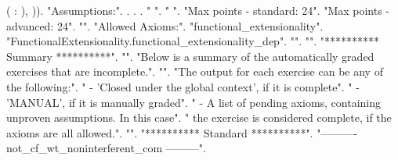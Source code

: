 \documentclass[12pt]{report}
\begin{document}
\begin{coqdoccode}
\coqdocindent{1.50em}
(\coqdocvar{\_} :    ),\coqdoceol
\coqdocindent{0.50em}
  )).\coqdoceol
\coqdocnoindent
{} "Assumptions:".\coqdoceol
\coqdocnoindent
{}.\coqdoceol
\coqdocnoindent
{}  .\coqdoceol
\coqdocnoindent
{} .\coqdoceol
\coqdocnoindent
{} " ".\coqdoceol
\coqdocemptyline
\coqdocnoindent
{} " ".\coqdoceol
\coqdocemptyline
\coqdocnoindent
{} "Max points - standard: 24".\coqdoceol
\coqdocnoindent
{} "Max points - advanced: 24".\coqdoceol
\coqdocnoindent
{} "".\coqdoceol
\coqdocnoindent
{} "Allowed Axioms:".\coqdoceol
\coqdocnoindent
{} "functional\_extensionality".\coqdoceol
\coqdocnoindent
{} "FunctionalExtensionality.functional\_extensionality\_dep".\coqdoceol
\coqdocnoindent
{} "".\coqdoceol
\coqdocnoindent
{} "".\coqdoceol
\coqdocnoindent
{} "********** Summary **********".\coqdoceol
\coqdocnoindent
{} "".\coqdoceol
\coqdocnoindent
{} "Below is a summary of the automatically graded exercises that are incomplete.".\coqdoceol
\coqdocnoindent
{} "".\coqdoceol
\coqdocnoindent
{} "The output for each exercise can be any of the following:".\coqdoceol
\coqdocnoindent
{} "  - 'Closed under the global context', if it is complete".\coqdoceol
\coqdocnoindent
{} "  - 'MANUAL', if it is manually graded".\coqdoceol
\coqdocnoindent
{} "  - A list of pending axioms, containing unproven assumptions. In this case".\coqdoceol
\coqdocnoindent
{} "    the exercise is considered complete, if the axioms are all allowed.".\coqdoceol
\coqdocnoindent
{} "".\coqdoceol
\coqdocnoindent
{} "********** Standard **********".\coqdoceol
\coqdocnoindent
{} "---------- not\_cf\_wt\_noninterferent\_com ---------".\coqdoceol

\end{coqdoccode}
\end{document}
